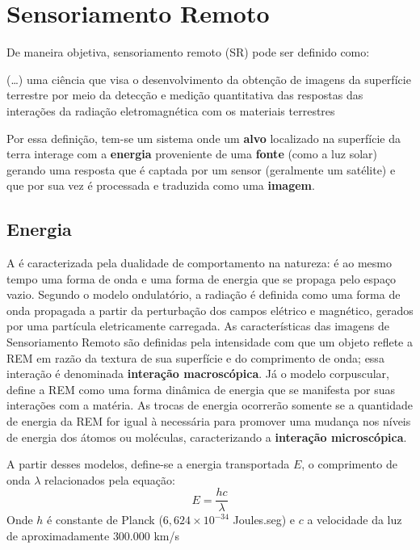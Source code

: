\section{Sensoriamento Remoto}\label{sensoriamento-remoto}

De maneira objetiva, sensoriamento remoto (SR) pode ser definido como:

\begin{citacao}
(\ldots{}) uma ciência que visa o desenvolvimento da obtenção de
imagens da superfície terrestre por meio da detecção e medição
quantitativa das respostas das interações da radiação eletromagnética
com os materiais terrestres \cite[p. 3]{meneses2012introduccao}
\end{citacao}

Por essa definição, tem-se um sistema onde um \textbf{alvo} localizado
na superfície da terra interage com a \textbf{energia} proveniente de
uma \textbf{fonte} (como a luz solar) gerando uma resposta que é captada
por um sensor (geralmente um satélite) e que por sua vez é processada e
traduzida como uma \textbf{imagem}.

\subsection{Energia}\label{energia}

A  é caracterizada pela dualidade de
comportamento na natureza: é ao mesmo tempo uma forma de onda e uma
forma de energia que se propaga pelo espaço vazio. Segundo o modelo
ondulatório, a radiação é definida como uma forma de onda propagada a
partir da perturbação dos campos elétrico e magnético, gerados por uma
partícula eletricamente carregada. As características das imagens de Sensoriamento Remoto
são definidas pela intensidade com que um objeto reflete a \acs{REM} em razão
da textura de sua superfície e do comprimento de onda; essa interação é
denominada \textbf{interação macroscópica}. Já o modelo corpuscular,
define a \acs{REM} como uma forma dinâmica de energia que se manifesta por
suas interações com a matéria. As trocas de energia ocorrerão somente se
a quantidade de energia da \acs{REM} for igual à necessária para promover uma
mudança nos níveis de energia dos átomos ou moléculas, caracterizando a
\textbf{interação microscópica}. \cite{meneses2012introduccao}

A partir desses modelos, define-se a energia transportada $E$, o
comprimento de onda $\lambda$ relacionados pela equação: 
\begin{equation}
E = \frac{hc}{\lambda}
\end{equation}Onde $h$ é constante de Planck ($6,624\times10^{-34}$ Joules.seg) e
$c$ a velocidade da luz de aproximadamente $300.000$ km/s

